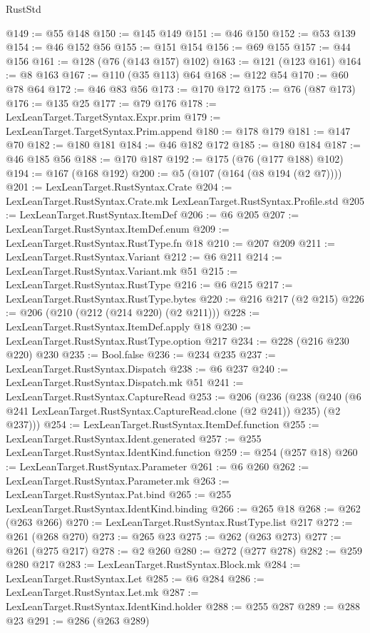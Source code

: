 \begin{lexlean}{RustStd}
\begin{coremodule}
@149 := @55 @148
@150 := @145 @149
@151 := @46 @150
@152 := @53 @139
@154 := @46 @152 @56
@155 := @151 @154
@156 := @69 @155
@157 := @44 @156
@161 := @128 (@76 (@143 @157) @102)
@163 := @121 (@123 @161)
@164 := @8 @163
@167 := @110 (@35 @113) @64
@168 := @122 @54
@170 := @60 @78 @64
@172 := @46 @83 @56
@173 := @170 @172
@175 := @76 (@87 @173)
@176 := @135 @25
@177 := @79 @176
@178 := LexLeanTarget.TargetSyntax.Expr.prim
@179 := LexLeanTarget.TargetSyntax.Prim.append
@180 := @178 @179
@181 := @147 @70
@182 := @180 @181
@184 := @46 @182 @172
@185 := @180 @184
@187 := @46 @185 @56
@188 := @170 @187
@192 := @175 (@76 (@177 @188) @102)
@194 := @167 (@168 @192)
@200 := @5 (@107 (@164 (@8 @194 (@2 @7))))
@201 := LexLeanTarget.RustSyntax.Crate
@204 := LexLeanTarget.RustSyntax.Crate.mk LexLeanTarget.RustSyntax.Profile.std
@205 := LexLeanTarget.RustSyntax.ItemDef
@206 := @6 @205
@207 := LexLeanTarget.RustSyntax.ItemDef.enum
@209 := LexLeanTarget.RustSyntax.RustType.fn @18
@210 := @207 @209
@211 := LexLeanTarget.RustSyntax.Variant
@212 := @6 @211
@214 := LexLeanTarget.RustSyntax.Variant.mk @51
@215 := LexLeanTarget.RustSyntax.RustType
@216 := @6 @215
@217 := LexLeanTarget.RustSyntax.RustType.bytes
@220 := @216 @217 (@2 @215)
@226 := @206 (@210 (@212 (@214 @220) (@2 @211)))
@228 := LexLeanTarget.RustSyntax.ItemDef.apply @18
@230 := LexLeanTarget.RustSyntax.RustType.option @217
@234 := @228 (@216 @230 @220) @230
@235 := Bool.false
@236 := @234 @235
@237 := LexLeanTarget.RustSyntax.Dispatch
@238 := @6 @237
@240 := LexLeanTarget.RustSyntax.Dispatch.mk @51
@241 := LexLeanTarget.RustSyntax.CaptureRead
@253 := @206
    (@236
      (@238 (@240 (@6 @241 LexLeanTarget.RustSyntax.CaptureRead.clone (@2 @241)) @235) (@2 @237)))
@254 := LexLeanTarget.RustSyntax.ItemDef.function
@255 := LexLeanTarget.RustSyntax.Ident.generated
@257 := @255 LexLeanTarget.RustSyntax.IdentKind.function
@259 := @254 (@257 @18)
@260 := LexLeanTarget.RustSyntax.Parameter
@261 := @6 @260
@262 := LexLeanTarget.RustSyntax.Parameter.mk
@263 := LexLeanTarget.RustSyntax.Pat.bind
@265 := @255 LexLeanTarget.RustSyntax.IdentKind.binding
@266 := @265 @18
@268 := @262 (@263 @266)
@270 := LexLeanTarget.RustSyntax.RustType.list @217
@272 := @261 (@268 @270)
@273 := @265 @23
@275 := @262 (@263 @273)
@277 := @261 (@275 @217)
@278 := @2 @260
@280 := @272 (@277 @278)
@282 := @259 @280 @217
@283 := LexLeanTarget.RustSyntax.Block.mk
@284 := LexLeanTarget.RustSyntax.Let
@285 := @6 @284
@286 := LexLeanTarget.RustSyntax.Let.mk
@287 := LexLeanTarget.RustSyntax.IdentKind.holder
@288 := @255 @287
@289 := @288 @23
@291 := @286 (@263 @289)

\end{coremodule}
\end{lexlean}
